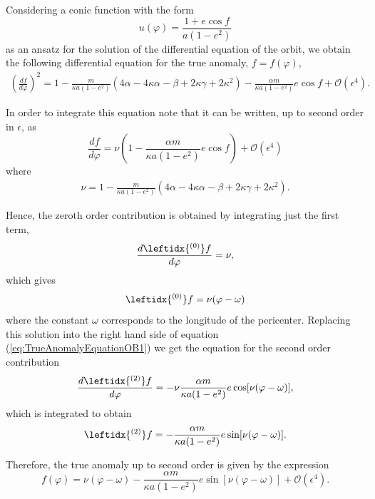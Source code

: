 Considering a conic function with the form
\begin{equation}
u(\varphi) = \frac{1+e \cos f}{a(1-e^2)}
\end{equation}
as an ansatz for the solution of the differential equation of the orbit, we obtain the following differential equation for the true anomaly, $f=f(\varphi)$,   
\begin{align}
\left( \frac{df}{d\varphi } \right)^2 = 1- \frac{m}{\kappa a (1-e^2)} \left( 4\alpha - 4\kappa \alpha - \beta + 2\kappa \gamma + 2\kappa^2 \right) -  \frac{\alpha m}{\kappa a (1-e^2)} e\cos f + \mathcal{O} (\epsilon^4).
\end{align}

In order to integrate this equation note that it can be written, up to second order in $\epsilon$, as
\begin{equation}
\frac{df}{d\varphi} = \nu \left( 1 - \frac{\alpha m}{\kappa a(1-e^2)} e \cos f \right) + \mathcal{O} ( \epsilon ^4 ) \label{eq:TrueAnomalyEquationOB1}
\end{equation}
where
\begin{align}
\nu =1- \frac{m}{\kappa a (1-e^2)} \left( 4\alpha - 4\kappa \alpha - \beta + 2\kappa \gamma + 2\kappa^2 \right).
\end{align}

Hence, the zeroth order contribution is obtained by integrating just the first term,
\begin{equation}
\frac{d \leftidx{^{(0)}}f}{d\varphi} = \nu ,
\end{equation}
which gives
\begin{equation}
\leftidx{^{(0)}}f = \nu (\varphi - \omega)
\end{equation}
where the constant $\omega$ corresponds to the longitude of the pericenter. Replacing this solution into the right hand side of equation (\ref{eq:TrueAnomalyEquationOB1}) we get the equation for the second order contribution 
\begin{equation}
\frac{d \leftidx{^{(2)}}f }{d\varphi} = - \nu  \frac{\alpha m}{\kappa a(1-e^2)} e \cos [\nu (\varphi - \omega)] ,
\end{equation}
which is integrated to obtain
\begin{equation}
\leftidx{^{(2)}}f = -   \frac{\alpha m}{\kappa a(1-e^2)} e \sin[\nu (\varphi - \omega)]. 
\end{equation}

Therefore, the true anomaly up to second order is given by the expression
\begin{equation}
f (\varphi ) = \nu (\varphi - \omega) -   \frac{\alpha m}{\kappa a(1-e^2)} e \sin [\nu (\varphi - \omega)] + \mathcal{O} ( \epsilon ^4 ).
\end{equation}

